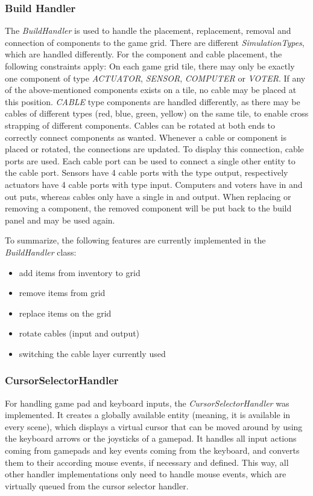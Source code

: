 \subsubsection{Build Handler}\label{subsubsec:build-handler}
The \textit{BuildHandler} is used to handle the placement, replacement, removal and connection of components to the game grid.
There are different \textit{SimulationTypes}, which are handled differently.
For the component and cable placement, the following constraints apply:
On each game grid tile, there may only be exactly one component of type \textit{ACTUATOR}, \textit{SENSOR}, \textit{COMPUTER} or \textit{VOTER}.
If any of the above-mentioned components exists on a tile, no cable may be placed at this position.
\textit{CABLE} type components are handled differently, as there may be cables of different types (red, blue, green, yellow) on the same tile, to enable
cross strapping of different components.
Cables can be rotated at both ends to correctly connect components as wanted.
Whenever a cable or component is placed or rotated, the connections are updated.
To display this connection, cable ports are used.
Each cable port can be used to connect a single other entity to the cable port.
Sensors have 4 cable ports with the type output, respectively actuators have 4 cable ports with type input.
Computers and voters have in and out puts, whereas cables only have a single in and output.
When replacing or removing a component, the removed component will be put back to the build panel and may be used again.

To summarize, the following features are currently implemented in the \textit{BuildHandler} class:
\begin{itemize}
    \item add items from inventory to grid
    \item remove items from grid
    \item replace items on the grid
    \item rotate cables (input and output)
    \item switching the cable layer currently used
\end{itemize}
\subsubsection{CursorSelectorHandler}\label{subsubsec:cursorselectorhandler}
For handling game pad and keyboard inputs, the \textit{CursorSelectorHandler} was implemented.
It creates a globally available entity (meaning, it is available in every scene), which displays a virtual cursor that can be
moved around by using the keyboard arrows or the joysticks of a gamepad.
It handles all input actions coming from gamepads and key events coming from the keyboard, and converts them to their according mouse events,
if necessary and defined.
This way, all other handler implementations only need to handle mouse events, which are virtually queued from the cursor selector handler.

